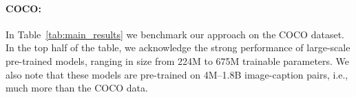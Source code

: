 \documentclass[10pt,twocolumn,letterpaper]{article}
\newcommand{\model}{\textsc{SmallCap}\xspace}
\begin{document}
\begin{table}[]
 \centering
    \caption{CIDEr results on the \texttt{nocaps} test set.  $\diamond$: Results copied from the respective publications. $\star$: Results computed by us. +W+H: datastore with additional Web and Human-labeled data.
    }
    \label{tab:nocaps_test}
\end{table}




\paragraph{COCO:} In Table~\ref{tab:main_results} we benchmark our approach on the COCO dataset. %
In the top half of the table, we acknowledge the strong performance of large-scale pre-trained models, ranging in size from 224M to 675M trainable parameters. We also note that these models are pre-trained on 4M--1.8B image-caption pairs, i.e., much more than the COCO data. 
\end{document}
